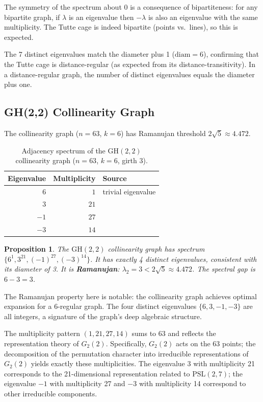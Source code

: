 \documentclass[11pt,a4paper]{article}
\theoremstyle{plain}
\newtheorem{proposition}[theorem]{Proposition}
\theoremstyle{definition}
\theoremstyle{remark}
\newcommand{\GH}{\mathrm{GH}(2,2)}
\newcommand{\PSL}{\mathrm{PSL}}
\begin{document}
The symmetry of the spectrum about 0 is a consequence of bipartiteness: for any bipartite
graph, if $\lambda$ is an eigenvalue then $-\lambda$ is also an eigenvalue with the same
multiplicity.  The Tutte cage is indeed bipartite (points vs.\ lines), so this is expected.

The 7 distinct eigenvalues match the diameter plus 1 ($\mathrm{diam} = 6$), confirming
that the Tutte cage is distance-regular (as expected from its distance-transitivity).
In a distance-regular graph, the number of distinct eigenvalues equals the diameter plus one.

\subsection{GH(2,2) Collinearity Graph}

The collinearity graph ($n = 63$, $k = 6$) has Ramanujan threshold $2\sqrt{5} \approx 4.472$.

\begin{table}[h]
\centering
\caption{Adjacency spectrum of the $\GH$ collinearity graph ($n=63$, $k=6$, girth 3).}
\label{tab:gh22}
\begin{tabular}{@{}rrl@{}}
\toprule
Eigenvalue & Multiplicity & Source \\
\midrule
$6$   & $1$  & trivial eigenvalue \\
$3$   & $21$ & \\
$-1$  & $27$ & \\
$-3$  & $14$ & \\
\bottomrule
\end{tabular}
\end{table}

\begin{proposition}
The $\GH$ collinearity graph has spectrum $\{6^1, 3^{21}, (-1)^{27}, (-3)^{14}\}$.
It has exactly 4 distinct eigenvalues, consistent with its diameter of 3.
It is \textbf{Ramanujan}: $\lambda_2 = 3 < 2\sqrt{5} \approx 4.472$.
The spectral gap is $6 - 3 = 3$.
\end{proposition}

The Ramanujan property here is notable: the collinearity graph achieves optimal expansion
for a 6-regular graph.  The four distinct eigenvalues $\{6, 3, -1, -3\}$ are all integers,
a signature of the graph's deep algebraic structure.

The multiplicity pattern $(1, 21, 27, 14)$ sums to 63 and reflects the representation
theory of $G_2(2)$.  Specifically, $G_2(2)$ acts on the 63 points; the decomposition of
the permutation character into irreducible representations of $G_2(2)$ yields exactly
these multiplicities.  The eigenvalue 3 with multiplicity 21 corresponds to the 21-dimensional
representation related to $\PSL(2,7)$; the eigenvalue $-1$ with multiplicity 27 and $-3$
with multiplicity 14 correspond to other irreducible components.
\end{document}
